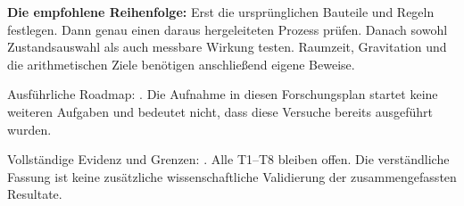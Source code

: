 \documentclass[10pt,a4paper]{article}
\begin{document}
\textbf{Die empfohlene Reihenfolge:} Erst die ursprünglichen Bauteile und
Regeln festlegen. Dann genau einen daraus hergeleiteten Prozess prüfen.
Danach sowohl Zustandsauswahl als auch messbare Wirkung testen. Raumzeit,
Gravitation und die arithmetischen Ziele benötigen anschließend eigene Beweise.

\small Ausführliche Roadmap:
.
Die Aufnahme in diesen Forschungsplan startet keine weiteren Aufgaben
und bedeutet nicht, dass diese Versuche bereits ausgeführt wurden.

\small Vollständige Evidenz und Grenzen:
.
Alle T1--T8 bleiben offen. Die verständliche Fassung ist keine zusätzliche
wissenschaftliche Validierung der zusammengefassten Resultate.
\end{document}
